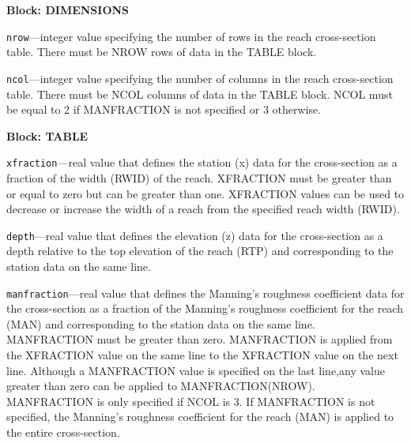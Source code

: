 
\item \textbf{Block: DIMENSIONS}

\begin{description}
\item \texttt{nrow}---integer value specifying the number of rows in the reach cross-section table. There must be NROW rows of data in the TABLE block.

\item \texttt{ncol}---integer value specifying the number of columns in the reach cross-section table. There must be NCOL columns of data in the TABLE block. NCOL must be equal to 2 if MANFRACTION is not specified or 3 otherwise.

\end{description}
\item \textbf{Block: TABLE}

\begin{description}
\item \texttt{xfraction}---real value that defines the station (x) data for the cross-section as a fraction of the width (RWID) of the reach. XFRACTION must be greater than or equal to zero but can be greater than one. XFRACTION values can be used to decrease or increase the width of a reach from the specified reach width (RWID).

\item \texttt{depth}---real value that defines the elevation (z) data for the cross-section as a depth relative to the top elevation of the reach (RTP) and corresponding to the station data on the same line.

\item \texttt{manfraction}---real value that defines the Manning's roughness coefficient data for the cross-section as a fraction of the Manning's roughness coefficient for the reach (MAN) and corresponding to the station data on the same line. MANFRACTION must be greater than zero. MANFRACTION is applied from the XFRACTION value on the same line to the XFRACTION value on the next line. Although a MANFRACTION value is specified on the last line,any value greater than zero can be applied to MANFRACTION(NROW). MANFRACTION is only specified if NCOL is 3. If MANFRACTION is not specified, the Manning's roughness coefficient for the reach (MAN) is applied to the entire cross-section.

\end{description}

